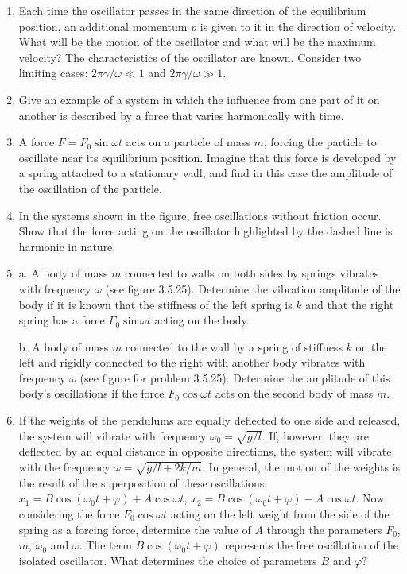 \documentclass{article}
\begin{document}
\begin{enumerate}[label=3.5.\arabic*]
\item Each time the oscillator passes in the same direction of the equilibrium position, an additional momentum $p$ is given to it in the direction of velocity. What will be the motion of the oscillator and what will be the maximum velocity? The characteristics of the oscillator are known. Consider two limiting cases: $2 \pi \gamma/ \omega \ll 1$ and $2 \pi \gamma/ \omega \gg 1$.

\item Give an example of a system in which the influence from one part of it on another is described by a force that varies harmonically with time.

\item A force $F = F_0 \sin{\omega t}$ acts on a particle of mass $m$, forcing the particle to oscillate near its equilibrium position. Imagine that this force is developed by a spring attached to a stationary wall, and find in this case the amplitude of the oscillation of the particle.

\item In the systems shown in the figure, free oscillations without friction occur. Show that the force acting on the oscillator highlighted by the dashed line is harmonic in nature.

\item a. A body of mass $m$ connected to walls on both sides by springs vibrates with frequency $\omega$ (see figure 3.5.25). Determine the vibration amplitude of the body if it is known that the stiffness of the left spring is $k$ and that the right spring has a force $F_0 \sin{\omega t}$ acting on the body. 

b. A body of mass $m$ connected to the wall by a spring of stiffness $k$ on the left and rigidly connected to the right with another body vibrates with frequency $\omega$ (see figure for problem 3.5.25). Determine the amplitude of this body's oscillations if the force $F_0 \cos{\omega t}$ acts on the second body of mass $m$.

\item If the weights of the pendulums are equally deflected to one side and released, the system will vibrate with frequency $\omega_0 = \sqrt{g/l}$. If, however, they are deflected by an equal distance in opposite directions, the system will vibrate with the frequency $\omega =  \sqrt{g/l + 2k/m}$. In general, the motion of the weights is the result of the superposition of these oscillations: $x_1 = B \cos{(\omega_0 t + \varphi)} + A \cos{\omega t}$, $x_2 = B \cos{(\omega_0 t + \varphi)} - A  \cos{\omega t}$. Now, considering the force $F_0 \cos{\omega t}$ acting on the left weight from the side of the spring as a forcing force, determine the value of $A$ through the parameters $F_0$, $m$, $\omega_0$ and $\omega$. The term $B \cos{(\omega_0 t + \varphi)}$ represents the free oscillation of the isolated oscillator. What determines the choice of parameters $B$ and $\varphi$?


\end{enumerate}
\end{document}
